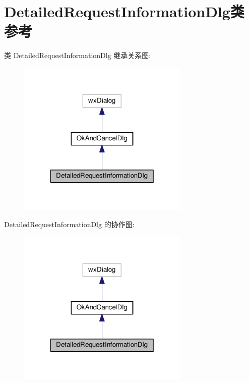 \hypertarget{class_detailed_request_information_dlg}{\section{Detailed\+Request\+Information\+Dlg类 参考}
\label{class_detailed_request_information_dlg}
}


类 Detailed\+Request\+Information\+Dlg 继承关系图\+:
\nopagebreak
\begin{figure}[H]
\begin{center}
\leavevmode
\includegraphics[width=232pt]{class_detailed_request_information_dlg__inherit__graph}
\end{center}
\end{figure}


Detailed\+Request\+Information\+Dlg 的协作图\+:
\nopagebreak
\begin{figure}[H]
\begin{center}
\leavevmode
\includegraphics[width=232pt]{class_detailed_request_information_dlg__coll__graph}
\end{center}
\end{figure}
